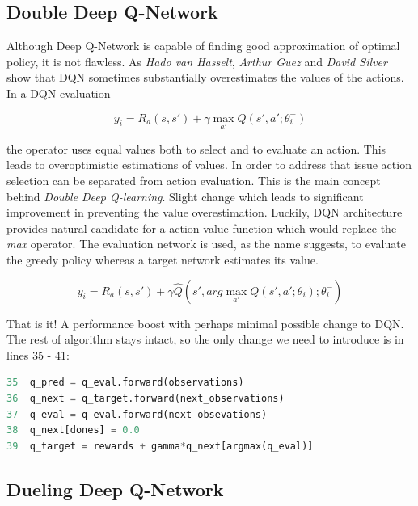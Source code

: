 \subsection{Double Deep Q-Network}
\label{sub:double-deep-q-network}

Although Deep Q-Network is capable of finding good approximation of optimal policy, it is not flawless. As \emph{Hado van Hasselt}, \emph{Arthur Guez} and \emph{David Silver} \cite{DBLP:journals/corr/HasseltGS15} show that DQN sometimes substantially overestimates the values of the actions. In a DQN evaluation

\begin{equation}
    y_i = R_a(s, s') + \gamma \max_{a'}Q(s', a'; \theta^-_i)
\end{equation}

the  operator uses equal values both to select and to evaluate an action. This leads to overoptimistic estimations of values. In order to address that issue action selection can be separated from action evaluation. This is the main concept behind \emph{Double Deep Q-learning}. Slight change which leads to significant improvement in preventing the value overestimation. Luckily, DQN architecture provides natural candidate for a action-value function which would replace the \emph{max} operator. The evaluation network is used, as the name suggests, to evaluate the greedy policy whereas a target network estimates its value.

\begin{equation}
    y_i = R_a(s, s') + \gamma \hat{Q}(s', arg\max_{a'}Q(s', a'; \theta_i); \theta^-_i)
\end{equation}

That is it! A performance boost with perhaps minimal possible change to DQN. The rest of algorithm stays intact, so the only change we need to introduce is in lines 35 - 41:

\begin{lstlisting}[language=Python, caption={Double Deep Q-learning modification}]
35  q_pred = q_eval.forward(observations)
36  q_next = q_target.forward(next_observations)
37  q_eval = q_eval.forward(next_obsevations)
38  q_next[dones] = 0.0
39  q_target = rewards + gamma*q_next[argmax(q_eval)]
\end{lstlisting}

\subsection{Dueling Deep Q-Network}
\label{sub:dueling-deep-q-network}


